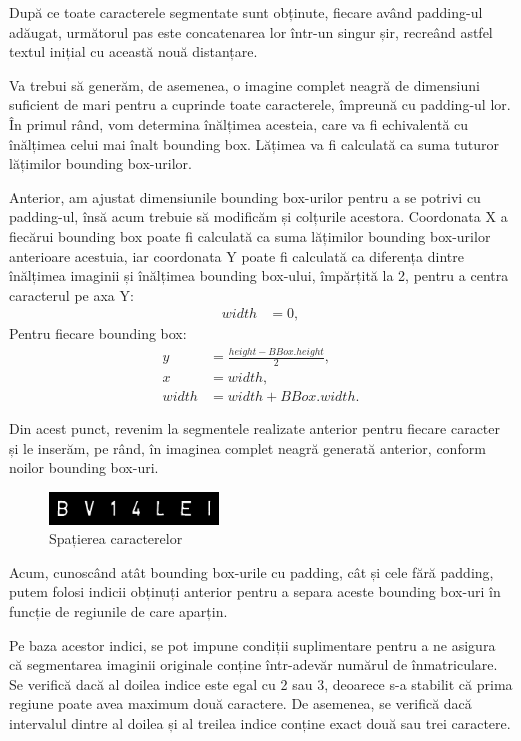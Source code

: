 \documentclass[a4paper,12pt]{report}
\begin{document}
După ce toate caracterele segmentate sunt obținute, fiecare având padding-ul adăugat, următorul pas este concatenarea lor într-un singur șir, recreând astfel textul inițial cu această nouă distanțare.

Va trebui să generăm, de asemenea, o imagine complet neagră de dimensiuni suficient de mari pentru a cuprinde toate caracterele, împreună cu padding-ul lor. În primul rând, vom determina înălțimea acesteia, care va fi echivalentă cu înălțimea celui mai înalt bounding box. Lățimea va fi calculată ca suma tuturor lățimilor bounding box-urilor.

Anterior, am ajustat dimensiunile bounding box-urilor pentru a se potrivi cu padding-ul, însă acum trebuie să modificăm și colțurile acestora. Coordonata X a fiecărui bounding box poate fi calculată ca suma lățimilor bounding box-urilor anterioare acestuia, iar coordonata Y poate fi calculată ca diferența dintre înălțimea imaginii și înălțimea bounding box-ului, împărțită la 2, pentru a centra caracterul pe axa Y:
\[
    \begin{aligned}
        width & = 0,
    \end{aligned}
\]
Pentru fiecare bounding box:
\[
    \begin{aligned}
        y     & = \frac{height - BBox.height}{2}, \\
        x     & = width,                          \\
        width & = width + BBox.width.
    \end{aligned}
\]

Din acest punct, revenim la segmentele realizate anterior pentru fiecare caracter și le inserăm, pe rând, în imaginea complet neagră generată anterior, conform noilor bounding box-uri.

\begin{figure}[h!]
    \centering
    \includegraphics[width=0.4\textwidth]{images/spaced.jpg}
    \caption{Spațierea caracterelor}
\end{figure}
\FloatBarrier

Acum, cunoscând atât bounding box-urile cu padding, cât și cele fără padding, putem folosi indicii obținuți anterior pentru a separa aceste bounding box-uri în funcție de regiunile de care aparțin.

Pe baza acestor indici, se pot impune condiții suplimentare pentru a ne asigura că segmentarea imaginii originale conține într-adevăr numărul de înmatriculare. Se verifică dacă al doilea indice este egal cu 2 sau 3, deoarece s-a stabilit că prima regiune poate avea maximum două caractere. De asemenea, se verifică dacă intervalul dintre al doilea și al treilea indice conține exact două sau trei caractere.
\end{document}
